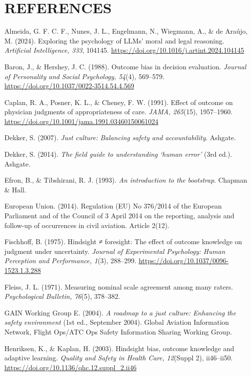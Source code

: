 \documentclass{aer}
\begin{document}
\section*{REFERENCES}
{\setlength{\parindent}{-1.5em}\setlength{\leftskip}{1.5em}\setlength{\parskip}{3pt}
Almeida, G. F. C. F., Nunes, J. L., Engelmann, N., Wiegmann, A., \& de Araújo, M. (2024). Exploring the psychology of LLMs' moral and legal reasoning. \emph{Artificial Intelligence, 333}, 104145. \url{https://doi.org/10.1016/j.artint.2024.104145}

Baron, J., \& Hershey, J. C. (1988). Outcome bias in decision evaluation. \emph{Journal of Personality and Social Psychology, 54}(4), 569--579. \url{https://doi.org/10.1037/0022-3514.54.4.569}

Caplan, R. A., Posner, K. L., \& Cheney, F. W. (1991). Effect of outcome on physician judgments of appropriateness of care. \emph{JAMA, 265}(15), 1957--1960. \url{https://doi.org/10.1001/jama.1991.03460150061024}

Dekker, S. (2007). \emph{Just culture: Balancing safety and accountability}. Ashgate.

Dekker, S. (2014). \emph{The field guide to understanding `human error'} (3rd ed.). Ashgate.

Efron, B., \& Tibshirani, R. J. (1993). \emph{An introduction to the bootstrap}. Chapman \& Hall.

European Union. (2014). Regulation (EU) No 376/2014 of the European Parliament and of the Council of 3 April 2014 on the reporting, analysis and follow-up of occurrences in civil aviation. Article 2(12).

Fischhoff, B. (1975). Hindsight ≠ foresight: The effect of outcome knowledge on judgment under uncertainty. \emph{Journal of Experimental Psychology: Human Perception and Performance, 1}(3), 288--299. \url{https://doi.org/10.1037/0096-1523.1.3.288}

Fleiss, J. L. (1971). Measuring nominal scale agreement among many raters. \emph{Psychological Bulletin, 76}(5), 378--382.

GAIN Working Group E. (2004). \emph{A roadmap to a just culture: Enhancing the safety environment} (1st ed., September 2004). Global Aviation Information Network, Flight Ops/ATC Ops Safety Information Sharing Working Group.

Henriksen, K., \& Kaplan, H. (2003). Hindsight bias, outcome knowledge and adaptive learning. \emph{Quality and Safety in Health Care, 12}(Suppl 2), ii46--ii50. \url{https://doi.org/10.1136/qhc.12.suppl\_2.ii46}

}
\end{document}
